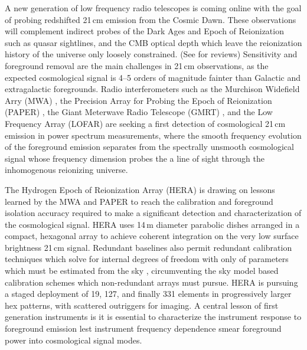 \documentclass{emulateapj}
\begin{document}
A new generation of low frequency radio telescopes is coming online with the goal of
 probing redshifted 21\,cm emission from the Cosmic Dawn. These observations will 
 complement indirect probes of the Dark Ages and Epoch of Reionization such as quasar 
 sightlines, and the CMB optical depth which leave the reionization 
 history of the universe only loosely constrained. (See \citet{FurlanettoReview, miguelreview, PritchardLoebReview, aviBook, zaroubi} for reviews) Sensitivity and foreground removal are 
 the main challenges in 21\,cm observations, as the expected cosmological signal is 4--5 
 orders of magnitude fainter than Galactic and extragalactic foregrounds. Radio 
 interferometers such as the Murchison Widefield Arry (MWA) \citep{tingay13,mwascience}, the Precision Array for Probing the Epoch of Reionization (PAPER) \citep{ali2015}, the Giant Meterwave Radio Telescope (GMRT) 
 \citep{Paciga2011}, and the Low Frequency Array (LOFAR) \citep{lofar} are seeking a first detection of 
 cosmological 21\,cm emission in power spectrum measurements, where the smooth 
 frequency evolution of the foreground emission separates from the spectrally 
 unsmooth cosmological signal whose frequency dimension probes the a line of sight through the 
 inhomogenous reionizing universe.


The Hydrogen Epoch of Reionization Array (HERA) \citep[][, deBoer et al., submitted]{PoberNextGen} is drawing on lessons learned by the MWA and PAPER to reach the calibration and foreground isolation accuracy required to make a significant detection and characterization of the cosmological signal. HERA uses 14\,m diameter parabolic dishes arranged in a compact, hexagonal array to achieve coherent integration on the very low surface brightness 21\,cm signal. Redundant baselines also permit redundant calibration techniques which solve for internal degrees of freedom with only of parameters which must be estimated from the sky \citep{zheng14}, circumventing the sky model based calibration schemes which non-redundant arrays must pursue. HERA is pursuing a staged deployment of 19, 127, and finally 331 elements in progressively larger hex patterns, with scattered outriggers for imaging. A central lesson of first generation instruments is it is essential to characterize the instrument response to foreground emission lest instrument frequency dependence smear foreground power into cosmological signal modes. 

\end{document}
